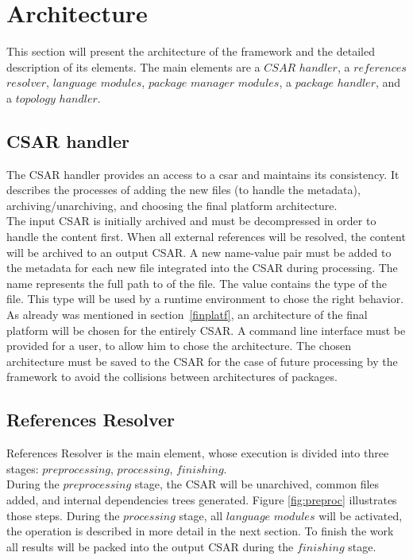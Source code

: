 \section{Architecture}\label{sec:arch}
This section will present the architecture of the framework and the detailed description of its elements.
The main elements are a \boldmath $CSAR$ $handler$, a $references$ $resolver$, $language$ $modules$, $package$ $manager$ $modules$, a $package$ $handler$, and a $topology$ $handler$. \unboldmath

\subsection{CSAR handler} \label{subs:casr_h}
The CSAR handler provides an access to a \gls{csar} and maintains its consistency. 
It describes the processes of adding the new files (to handle the metadata), \mbox{archiving/unarchiving}, and choosing the final platform architecture. \\
The input CSAR is initially archived and must be decompressed in order to handle the content first.
When all external references will be resolved, the content will be archived to an output CSAR.
A new name-value pair must be added to the metadata for each new file integrated into the CSAR during processing. 
The name represents the full path to of the file.
The value contains the type of the file. 
This type will be used by a runtime environment to chose the right behavior. %
As already was mentioned in section~\ref{finplatf}, an architecture of the final platform will be chosen for the entirely CSAR.
A command line interface must be provided for a user, to allow him to chose the architecture. 
The chosen architecture must be saved to the CSAR for the case of future processing by the framework to avoid the collisions between architectures of packages.

\subsection{References Resolver} \label{subs:RR}
References Resolver is the main element, whose execution is divided into three stages: $preprocessing$, $processing$, $finishing$. \\
During the $preprocessing$ stage, the CSAR will be unarchived, common files added, and internal dependencies trees generated.
Figure \ref{fig:preproc} illustrates those steps.
During the $processing$ stage, all $language$ $modules$ will be activated, the operation is described in more detail in the next section. %
To finish the work all results will be packed into the output CSAR during the $finishing$ stage.


